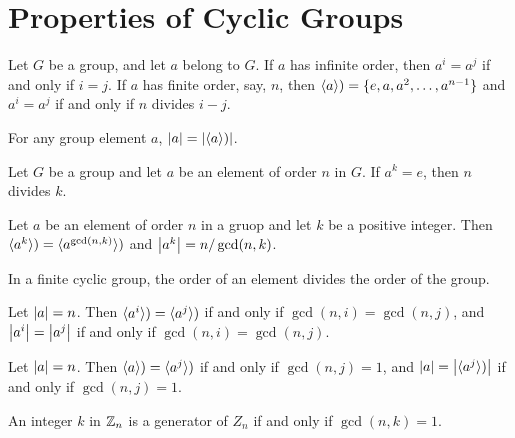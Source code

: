 \section{Properties of Cyclic Groups}

\begin{theorem}[Criterion for $\mathbf{a^i=a^j}$]
	Let $G$ be a group, and let $a$ belong to $G$. If $a$ has infinite order, then $a^i = a^j$ if and only if $i = j$. If $a$ has finite order, say, $n$, then $\langle a \rangle) = \{e, a, a^2, \dots, a^{n - 1}\}$ and $a^i = a^j$ if and only if $n$ divides $i - j$.
\end{theorem}

\begin{corollary}[$\mathbf{\abs{a}=\abs{\lr{a}}}$]
	For any group element $a$, $\left\lvert a \right\rvert = \left\lvert \langle a \rangle) \right\rvert$.
\end{corollary}

\begin{corollary}[$\mathbf{a^k = e}$ Implies That $\mathbf{\abs{a}}$ Divides $\mathbf{k}$]
	Let $G$ be a group and let $a$ be an element of order $n$ in $G$. If $a^k = e$, then $n$ divides $k$.
\end{corollary}

\begin{theorem}[$\mathbf{\lr{a^k} = \lr{a^{\textbf{gcd}(n,k)}}}$ and $\mathbf{\abs{a^k} = n/\textbf{gcd}(n,k)}$]
	Let $a$ be an element of order $n$ in a gruop and let $k$ be a positive integer. Then $\langle a^k \rangle) = \langle a^{\gcd(n,k)} \rangle)$ and $\left\lvert a^k \right\rvert = n / \gcd(n,k)$.
\end{theorem}

\begin{corollary}
	In a finite cyclic group, the order of an element divides the order of the group.
\end{corollary}

\begin{corollary}[Criterion for $\mathbf{\lr{a^i} = \lr{a^j}}$ and $\mathbf{\abs{a^i} = \abs{a^j}}$]
	Let $\left\lvert a \right\rvert = n$. Then $\langle a^i \rangle) = \langle a^j \rangle)$ if and only if $\gcd(n, i) = \gcd(n,j)$, and $\left\lvert a^i \right\rvert = \left\lvert a^j \right\rvert$ if and only if $\gcd(n,i) = \gcd(n,j)$.
\end{corollary}

\begin{corollary}
	Let $\left\lvert a \right\rvert = n$. Then $\langle a \rangle) = \langle a^j \rangle)$ if and only if $\gcd(n,j) = 1$, and $\left\lvert a \right\rvert = \left\lvert \langle a^j \rangle) \right\rvert$ if and only if $\gcd(n,j) = 1$.
\end{corollary}

\begin{corollary}
	An integer $k$ in $\mathbb{Z}_n$ is a generator of $Z_n$ if and only if $\gcd(n,k) = 1$.
\end{corollary}
